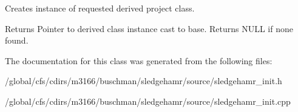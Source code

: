 Creates instance of requested derived project class. 

\begin{DoxyReturn}{Returns}
Pointer to derived class instance cast to base. Returns N\+U\+LL if none found. 
\end{DoxyReturn}


The documentation for this class was generated from the following files\+:\begin{DoxyCompactItemize}
\item 
/global/cfs/cdirs/m3166/buschman/sledgehamr/source/sledgehamr\+\_\+init.\+h\item 
/global/cfs/cdirs/m3166/buschman/sledgehamr/source/sledgehamr\+\_\+init.\+cpp\end{DoxyCompactItemize}
